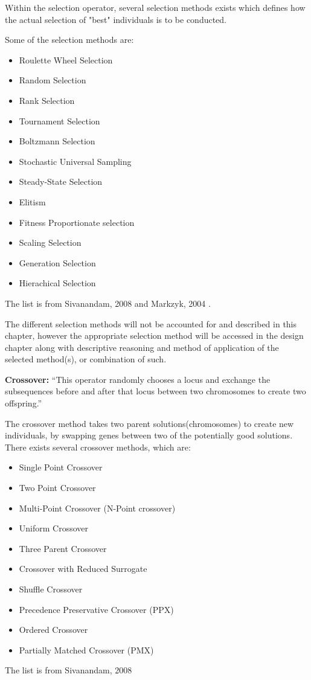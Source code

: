 \begin{itemize}
Within the selection operator, several selection methods exists which defines how the actual selection of "best" individuals is to be conducted.

Some of the selection methods are:
\begin{itemize}
\item Roulette Wheel Selection
\item Random Selection
\item Rank Selection
\item Tournament Selection
\item Boltzmann Selection
\item Stochastic Universal Sampling
\item Steady-State Selection
\item Elitism
\item Fitness Proportionate selection
\item Scaling Selection
\item Generation Selection
\item Hierachical Selection
\end{itemize}
The list is from Sivanandam, 2008 \cite[pp. 46-50]{Sivanandam2008} and Markzyk, 2004 \cite{Adam2004}.

The different selection methods will not be accounted for and described in this chapter, however the appropriate selection method will be accessed in the design chapter along with descriptive reasoning and method of application of the selected method(s), or combination of such.

\textbf{Crossover:} \enquote{This operator randomly chooses a locus and exchange the subsequences before and after that locus between two chromosomes to create two offspring.} \cite[pp. 8]{Melanie1990}

The crossover method takes two parent solutions(chromosomes) to create new individuals, by swapping genes between two of the potentially good solutions. There exists several crossover methods, which are:


\begin{itemize}
\item Single Point Crossover
\item Two Point Crossover
\item Multi-Point Crossover (N-Point crossover)
\item Uniform Crossover
\item Three Parent Crossover
\item Crossover with Reduced Surrogate
\item Shuffle Crossover
\item Precedence Preservative Crossover (PPX)
\item Ordered Crossover
\item Partially Matched Crossover (PMX)
\end{itemize}
The list is from Sivanandam, 2008 \cite[pp. 50-56]{Sivanandam2008}


\end{itemize}
